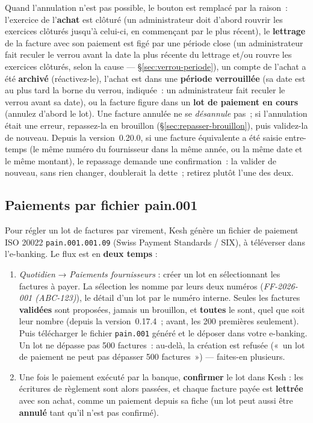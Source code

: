 \documentclass[a4paper,11pt,oneside]{article}
\begin{document}
Quand l'annulation n'est pas possible, le bouton est remplacé par la raison~: l'exercice de
l'\textbf{achat} est clôturé (un administrateur doit d'abord rouvrir les exercices clôturés
jusqu'à celui-ci, en commençant par le plus récent), le \textbf{lettrage} de la facture avec
son paiement est figé par une période close (un administrateur fait reculer le verrou avant la
date la plus récente du lettrage et/ou rouvre les exercices clôturés, selon la cause ---
\S\ref{sec:verrou-periode}), un compte de l'achat
a été \textbf{archivé} (réactivez-le), l'achat est dans une \textbf{période verrouillée} (sa
date est au plus tard la borne du verrou, indiquée~: un administrateur fait reculer le verrou
avant sa date), ou la facture figure dans un \textbf{lot de paiement en cours} (annulez d'abord le
lot). Une facture annulée ne se \emph{désannule} pas~; si l'annulation était une erreur,
repassez-la en brouillon (\S\ref{sec:repasser-brouillon}), puis validez-la de nouveau. Depuis
la version~0.20.0, si une facture équivalente a été saisie entre-temps (le même numéro du
fournisseur dans la même année, ou la même date et le même montant), le repassage demande une
confirmation~: la valider de nouveau, sans rien changer, doublerait la dette~; retirez plutôt
l'une des deux.

\subsection{Paiements par fichier pain.001}
\label{sec:paiements-fournisseurs}

Pour régler un lot de factures par virement, Kesh génère un fichier de paiement
ISO 20022 \texttt{pain.001.001.09} (Swiss Payment Standards / SIX), à téléverser
dans l'e-banking. Le flux est en \textbf{deux temps} :

\begin{enumerate}
    \item \emph{Quotidien} → \emph{Paiements fournisseurs} : créer un lot en
    sélectionnant les factures à payer. La sélection les nomme par leurs deux numéros
    (\emph{FF-2026-001 (ABC-123)}), le détail d'un lot par le numéro interne. Seules les
    factures \textbf{validées} sont proposées, jamais un brouillon, et \textbf{toutes} le
    sont, quel que soit leur nombre (depuis la version~0.17.4~; avant, les 200 premières
    seulement). Puis télécharger le fichier
    \texttt{pain.001} généré et le déposer dans votre e-banking. Un lot ne dépasse pas
    500 factures~: au-delà, la création est refusée («~un lot de paiement ne peut pas dépasser
    500 factures~») --- faites-en plusieurs.
    \item Une fois le paiement exécuté par la banque, \textbf{confirmer} le lot
    dans Kesh : les écritures de règlement sont alors passées, et chaque facture
    payée est \textbf{lettrée} avec son achat, comme un paiement depuis sa fiche
    (un lot peut aussi être \textbf{annulé} tant qu'il n'est pas confirmé).
\end{enumerate}
\end{document}
